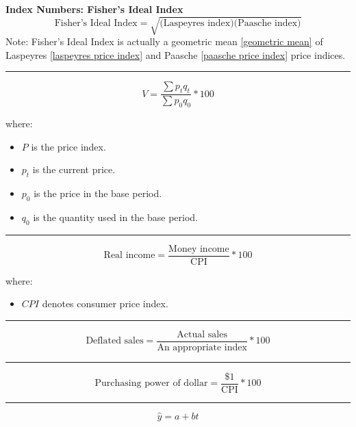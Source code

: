 \documentclass[	DIV=calc,%
							paper=a4,%
							fontsize=11pt,%
							twocolumn]{scrartcl} %
\newcommand{\hformbar}[1]{\vspace{5pt}\hrule\vspace{10pt}} %
\newcommand{\formdesc}[1]{\noindent\textbf{#1}}
\begin{document}
\formdesc{Index Numbers: Fisher's Ideal Index}
\begin{equation}
\label{fisher ideal index}
\text{Fisher's Ideal Index} = \sqrt{\text{(Laspeyres index)}\text{(Paasche index)}}
\end{equation}
Note: Fisher's Ideal Index is actually a geometric mean \eqref{geometric mean} of Laspeyres \eqref{laspeyres price index} and Paasche \eqref{paasche price index} price indices.
\hformbar


\formdesc{Index Numbers: Value Index}
\begin{equation}
\label{value index}
V = \frac{\sum p_t q_t}{\sum p_0 q_0}*100
\end{equation}

where:
\begin{itemize}
 \item $P$ is the price index.
 \item $p_t$ is the current price.
 \item $p_0$ is the price in the base period.
 \item $q_0$ is the quantity used in the base period.
\end{itemize}
\hformbar


\formdesc{Index Numbers: Real Income}
\begin{equation}
\label{real income}
\text{Real income} = \frac{\text{Money income}}{\text{CPI}}*100
\end{equation}

where:
\begin{itemize}
 \item $CPI$ denotes consumer price index.
\end{itemize}
\hformbar


\formdesc{Index Numbers: Index as a Deflator}
\begin{equation}
\label{index deflator}
\text{Deflated sales} = \frac{\text{Actual sales}}{\text{An appropriate index}}*100
\end{equation}
\hformbar


\formdesc{Index Numbers: Index for Purchasing Power}
\begin{equation}
\label{purchasing power}
\text{Purchasing power of dollar} = \frac{\text{\$1}}{\text{CPI}}*100
\end{equation}
\hformbar



\formdesc{Time Series \& Forecasting: Linear Trend Equation}
\begin{equation}
\label{linear trend equation}
\hat{y} = a + bt
\end{equation}
\end{document}
